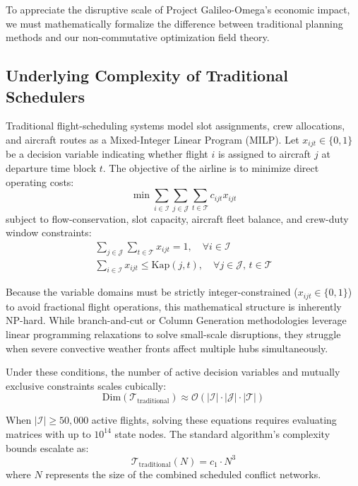 \documentclass[11pt,a4paper]{book}
\begin{document}
To appreciate the disruptive scale of Project Galileo-Omega's economic impact, we must mathematically formalize the difference between traditional planning methods and our non-commutative optimization field theory.

\subsection{Underlying Complexity of Traditional Schedulers}

Traditional flight-scheduling systems model slot assignments, crew allocations, and aircraft routes as a Mixed-Integer Linear Program (MILP). Let $x_{ijt} \in \{0, 1\}$ be a decision variable indicating whether flight $i$ is assigned to aircraft $j$ at departure time block $t$. The objective of the airline is to minimize direct operating costs:
\begin{equation}
\label{eq:milp_objective}
\min \sum_{i \in \mathcal{I}} \sum_{j \in \mathcal{J}} \sum_{t \in \mathcal{T}} c_{ijt} x_{ijt}
\end{equation}
subject to flow-conservation, slot capacity, aircraft fleet balance, and crew-duty window constraints:
\begin{align}
\label{eq:milp_flow_constraint}
\sum_{j \in \mathcal{J}} \sum_{t \in \mathcal{T}} x_{ijt} = 1, \quad \forall i \in \mathcal{I} \\
\label{eq:milp_capacity_constraint}
\sum_{i \in \mathcal{I}} x_{ijt} \le \text{Kap}(j, t), \quad \forall j \in \mathcal{J}, \, t \in \mathcal{T}
\end{align}

Because the variable domains must be strictly integer-constrained ($x_{ijt} \in \{0,1\}$) to avoid fractional flight operations, this mathematical structure is inherently NP-hard. While branch-and-cut or Column Generation methodologies leverage linear programming relaxations to solve small-scale disruptions, they struggle when severe convective weather fronts affect multiple hubs simultaneously. 

Under these conditions, the number of active decision variables and mutually exclusive constraints scales cubically:
\begin{equation}
\label{eq:state_space_explosion}
\text{Dim}(\mathcal{T}_{\text{traditional}}) \approx \mathcal{O}(|\mathcal{I}| \cdot |\mathcal{J}| \cdot |\mathcal{T}|)
\end{equation}

When $|\mathcal{I}| \ge 50,000$ active flights, solving these equations requires evaluating matrices with up to $10^{14}$ state nodes. The standard algorithm's complexity bounds escalate as:
\begin{equation}
\label{eq:sub_cubic_scaling}
\mathcal{T}_{\text{traditional}}(N) = c_1 \cdot N^3
\end{equation}
where $N$ represents the size of the combined scheduled conflict networks.
\end{document}
